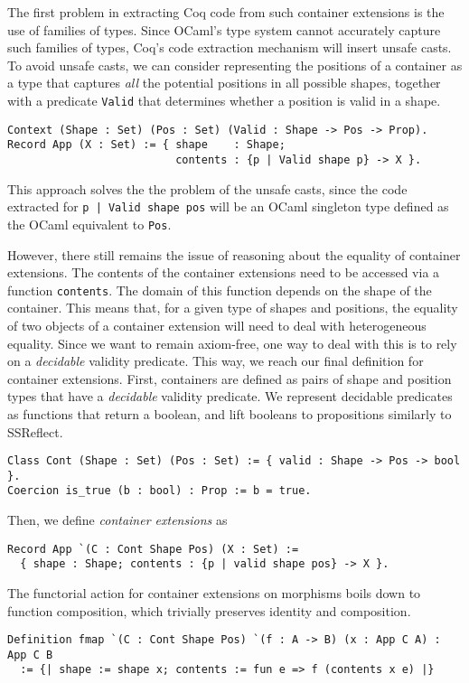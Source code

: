 \documentclass[a4paper, UKenglish, cleveref, autoref, thm-restate]{lipics-v2021}
\begin{document}
The first problem in extracting Coq code from such container extensions is the
use of families of types. Since OCaml's type system cannot accurately capture
such families of types, Coq's code extraction mechanism will insert unsafe
casts. To avoid unsafe casts, we can consider representing the positions of a
container as a type that captures \emph{all} the potential positions in all
possible shapes, together with a predicate \texttt{Valid} that
determines whether a position is valid in a shape. 
\begin{verbatim}
Context (Shape : Set) (Pos : Set) (Valid : Shape -> Pos -> Prop).
Record App (X : Set) := { shape    : Shape; 
                          contents : {p | Valid shape p} -> X }.
\end{verbatim}
This approach solves the the problem of the unsafe casts, since the code
extracted for \texttt{{p | Valid shape pos}} will be an OCaml
singleton type defined as the OCaml equivalent to \texttt{Pos}.

However, there still remains the issue of reasoning about the equality of
container extensions. The contents of the container extensions need to be
accessed via a function \texttt{contents}. The domain of this function
depends on the shape of the container. This means that, for a given type of
shapes and positions, the equality of two objects of a container extension will
need to deal with heterogeneous equality. Since we want to remain axiom-free,
one way to deal with this is to rely on a \emph{decidable} validity predicate.
This way, we reach our final definition for container extensions. First,
containers are defined as pairs of shape and position types that have a
\emph{decidable} validity predicate. We represent decidable predicates as
functions that return a boolean, and lift booleans to propositions similarly to
SSReflect.
\begin{verbatim}
Class Cont (Shape : Set) (Pos : Set) := { valid : Shape -> Pos -> bool }.
Coercion is_true (b : bool) : Prop := b = true.
\end{verbatim}
Then, we define \emph{container extensions} as
\begin{verbatim}
Record App `(C : Cont Shape Pos) (X : Set) :=
  { shape : Shape; contents : {p | valid shape pos} -> X }.
\end{verbatim}
The functorial action for container extensions on morphisms boils down to
function composition, which trivially preserves identity and composition.
\begin{verbatim}
Definition fmap `(C : Cont Shape Pos) `(f : A -> B) (x : App C A) : App C B
  := {| shape := shape x; contents := fun e => f (contents x e) |}
\end{verbatim}
\end{document}
